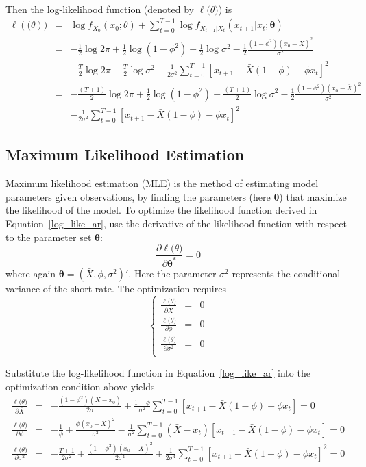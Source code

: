 \documentclass[11pt,reqno,final]{amsart}
\begin{document}
Then the log-likelihood function (denoted by $\ell\mathbf(\theta)$) is
\begin{eqnarray*} \label{log_like_ar}
\ell(\mathbf(\theta)) &=& \log f_{X_0}(x_0;\theta) + \sum_{t=0}^{T-1} \log f_{X_{t+1}|X_{t}}(x_{t+1}|x_t; \mathbf{\theta}) \\
                      &=& -\frac{1}{2}\log 2\pi + \frac{1}{2}\log(1-\phi^2)-\frac{1}{2}\log \sigma^2 - \frac{1}{2} \frac{(1-\phi^2)(x_0-\bar{X})^2}{\sigma^2} \\
                      & & -\frac{T}{2}\log 2\pi - \frac{T}{2} \log \sigma^2 - \frac{1}{2\sigma^2} \sum_{t=0}^{T-1} [x_{t+1} - \bar{X}(1-\phi)-\phi x_t]^2 \\
                      &=& -\frac{(T+1)}{2}\log 2\pi + \frac{1}{2}\log(1-\phi^2)-\frac{(T+1)}{2}\log \sigma^2 - \frac{1}{2} \frac{(1-\phi^2)(x_0-\bar{X})^2}{\sigma^2} \\
                      & & - \frac{1}{2\sigma^2} \sum_{t=0}^{T-1} [x_{t+1} - \bar{X}(1-\phi)-\phi x_t]^2
\end{eqnarray*}

\subsection{Maximum Likelihood Estimation}
Maximum likelihood estimation (MLE) is the method of estimating model parameters given observations, by finding the parameters (here $\mathbf{\theta}$) that maximize the likelihood of the model. To optimize the likelihood function derived in Equation~\ref{log_like_ar}, use the derivative of the likelihood function with respect to the parameter set $\mathbf{\theta}$:
$$
\frac{\partial \ell\mathbf(\theta)}{\partial \mathbf{\theta}^*} = 0
$$
where again $\mathbf{\theta} = (\bar{X}, \phi, \sigma^2)'$. Here the parameter $\sigma^2$ represents the conditional variance of the short rate. The optimization requires
$$
\left\{
  \begin{array}{rcr}
    \frac{\ell\mathbf(\theta)}{\partial \bar{X}} & = & 0 \\
    \frac{\ell\mathbf(\theta)}{\partial \phi} & = & 0 \\
    \frac{\ell\mathbf(\theta)}{\partial \sigma^2} & = & 0 \\
  \end{array}
\right.
$$

Substitute the log-likelihood function in Equation~\ref{log_like_ar} into the optimization condition above yields
\begin{eqnarray*}
    \frac{\ell\mathbf(\theta)}{\partial \bar{X}} & = & -\frac{(1-\phi^2)(\bar{X}-x_0)}{2\sigma} + \frac{1-\phi}{\sigma^2}\sum_{t=0}^{T-1}[x_{t+1}-\bar{X}(1-\phi)-\phi x_t] = 0 \\
    \frac{\ell\mathbf(\theta)}{\partial \phi} & = & -\frac{1}{\phi} + \frac{\phi(x_0-\bar{X})^2}{\sigma^2} - \frac{1}{\sigma^2}\sum_{t=0}^{T-1}(\bar{X} - x_t)[x_{t+1}-\bar{X}(1-\phi)-\phi x_t] = 0 \\
    \frac{\ell\mathbf(\theta)}{\partial \sigma^2} & = & -\frac{T+1}{2\sigma^2} + \frac{(1-\phi^2)(x_0-\bar{X})^2}{2\sigma^4} + \frac{1}{2\sigma^4}\sum_{t=0}^{T-1}[x_{t+1}-\bar{X}(1-\phi)-\phi x_t]^2 = 0 \\
\end{eqnarray*}
\end{document}
